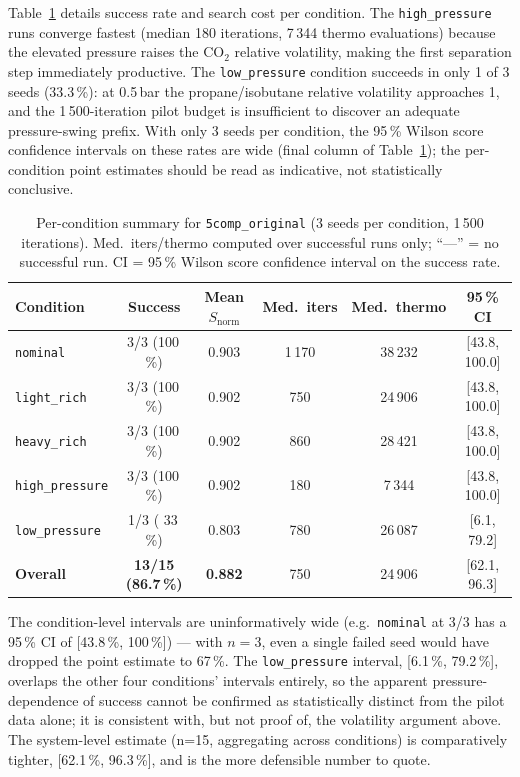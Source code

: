 \documentclass[11pt,a4paper]{article}
\theoremstyle{definition}
\theoremstyle{plain}
\begin{document}
Table~\ref{tab:5comp_conditions} details success rate and search cost per condition. The \texttt{high\_pressure} runs converge fastest (median 180 iterations, 7\,344 thermo evaluations) because the elevated pressure raises the CO$_2$ relative volatility, making the first separation step immediately productive. The \texttt{low\_pressure} condition succeeds in only 1 of 3 seeds (33.3\,\%): at 0.5\,bar the propane/isobutane relative volatility approaches 1, and the 1\,500-iteration pilot budget is insufficient to discover an adequate pressure-swing prefix. With only 3 seeds per condition, the 95\,\% Wilson score confidence intervals on these rates are wide (final column of Table~\ref{tab:5comp_conditions}); the per-condition point estimates should be read as indicative, not statistically conclusive.

\begin{table}[ht]
\centering
\caption{Per-condition summary for \texttt{5comp\_original}
 (3 seeds per condition, 1\,500 iterations).
 Med.\ iters/thermo computed over successful runs only;
 ``---'' = no successful run.
 CI = 95\,\% Wilson score confidence interval on the
 success rate.}
\label{tab:5comp_conditions}
\begin{tabular}{@{}lccccc@{}}
\toprule
Condition & Success & Mean $S_{\mathrm{norm}}$ &
 Med.\ iters & Med.\ thermo & 95\,\% CI \\
\midrule
\texttt{nominal}    & 3/3 (100\,\%) & 0.903 & 1\,170 & 38\,232 & [43.8, 100.0] \\
\texttt{light\_rich}  & 3/3 (100\,\%) & 0.902 &  750 & 24\,906 & [43.8, 100.0] \\
\texttt{heavy\_rich}  & 3/3 (100\,\%) & 0.902 &  860 & 28\,421 & [43.8, 100.0] \\
\texttt{high\_pressure} & 3/3 (100\,\%) & 0.902 &  180 & 7\,344 & [43.8, 100.0] \\
\texttt{low\_pressure} & 1/3 ( 33\,\%) & 0.803 &  780 & 26\,087 & [6.1, 79.2] \\
\midrule
\textbf{Overall}
 & \textbf{13/15 (86.7\,\%)} & \textbf{0.882} & 750 & 24\,906 & [62.1, 96.3] \\
\bottomrule
\end{tabular}
\end{table}

The condition-level intervals are uninformatively wide (e.g.\ \texttt{nominal} at 3/3 has a 95\,\% CI of [43.8\,\%, 100\,\%]) — with $n=3$, even a single failed seed would have dropped the point estimate to 67\,\%. The \texttt{low\_pressure} interval, [6.1\,\%, 79.2\,\%], overlaps the other four conditions' intervals entirely, so the apparent pressure-dependence of success cannot be confirmed as statistically distinct from the pilot data alone; it is consistent with, but not proof of, the volatility argument above. The system-level estimate (n=15, aggregating across conditions) is comparatively tighter, [62.1\,\%, 96.3\,\%], and is the more defensible number to quote.
\end{document}
